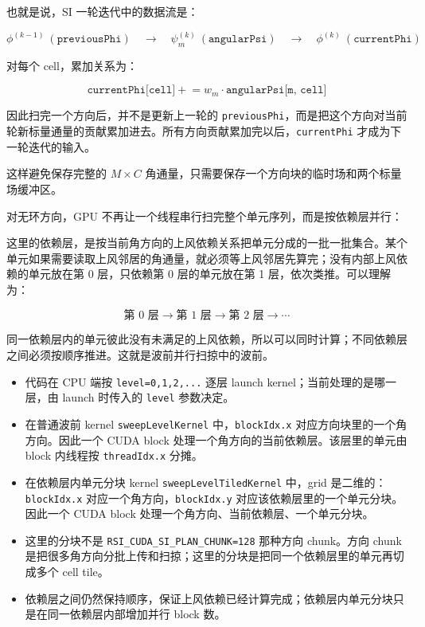 \documentclass[10pt]{article}
\newcommand{\subsect}[1]{\vspace{2mm}{\sffamily\large\bfseries #1}\par}
\newcommand{\code}[1]{\texttt{#1}}
\begin{document}
也就是说，SI 一轮迭代中的数据流是：

\[
\phi^{(k-1)}\ (\code{previousPhi})
\quad\longrightarrow\quad
\psi_m^{(k)}\ (\code{angularPsi})
\quad\longrightarrow\quad
\phi^{(k)}\ (\code{currentPhi})
\]

对每个 cell，累加关系为：

\[
\code{currentPhi[cell]} \mathrel{+}= w_m \cdot \code{angularPsi[m, cell]}
\]

因此扫完一个方向后，并不是更新上一轮的 \code{previousPhi}，而是把这个方向对当前轮新标量通量的贡献累加进去。所有方向贡献累加完以后，\code{currentPhi} 才成为下一轮迭代的输入。

这样避免保存完整的 $M \times C$ 角通量，只需要保存一个方向块的临时场和两个标量场缓冲区。

\subsect{3.2 无环方向的波前并行扫掠}

对无环方向，GPU 不再让一个线程串行扫完整个单元序列，而是按依赖层并行：

这里的依赖层，是按当前角方向的上风依赖关系把单元分成的一批一批集合。某个单元如果需要读取上风邻居的角通量，就必须等上风邻居先算完；没有内部上风依赖的单元放在第 0 层，只依赖第 0 层的单元放在第 1 层，依次类推。可以理解为：

\[
\text{第 0 层} \rightarrow \text{第 1 层} \rightarrow \text{第 2 层} \rightarrow \cdots
\]

同一依赖层内的单元彼此没有未满足的上风依赖，所以可以同时计算；不同依赖层之间必须按顺序推进。这就是波前并行扫掠中的波前。

\begin{itemize}
\item 代码在 CPU 端按 \code{level=0,1,2,...} 逐层 launch kernel；当前处理的是哪一层，由 launch 时传入的 \code{level} 参数决定。
\item 在普通波前 kernel \code{sweepLevelKernel} 中，\code{blockIdx.x} 对应方向块里的一个角方向。因此一个 CUDA block 处理一个角方向的当前依赖层。该层里的单元由 block 内线程按 \code{threadIdx.x} 分摊。
\item 在依赖层内单元分块 kernel \code{sweepLevelTiledKernel} 中，grid 是二维的：\code{blockIdx.x} 对应一个角方向，\code{blockIdx.y} 对应该依赖层里的一个单元分块。因此一个 CUDA block 处理一个角方向、当前依赖层、一个单元分块。
\item 这里的分块不是 \code{RSI\_CUDA\_SI\_PLAN\_CHUNK=128} 那种方向 chunk。方向 chunk 是把很多角方向分批上传和扫掠；这里的分块是把同一个依赖层里的单元再切成多个 cell tile。
\item 依赖层之间仍然保持顺序，保证上风依赖已经计算完成；依赖层内单元分块只是在同一依赖层内部增加并行 block 数。
\end{itemize}
\end{document}

